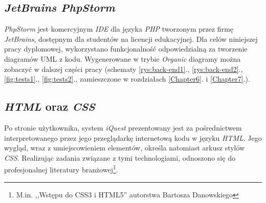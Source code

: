 \subsection{\textit{JetBrains PhpStorm}}
\label{Chapter63a}

\textit{PhpStorm} jest komercyjnym \textit{IDE} dla języka \textit{PHP} tworzonym przez firmę \textit{JetBrains}, dostępnym dla studentów na licencji edukacyjnej. Dla celów niniejszej pracy dyplomowej, wykorzystano funkcjonalność odpowiedzialną za tworzenie diagramów UML z kodu. Wygenerowane w trybie \textit{Organic} diagramy można zobaczyć w dalszej części pracy (schematy \ref{rys:back-end1}., \ref{rys:back-end2}., \ref{fig:tests1}., \ref{fig:tests2}., zamieszczone w rozdziałach \ref{Chapter6}. i \ref{Chapter7}.).

\subsection{\textit{HTML} oraz \textit{CSS}}
\label{Chapter63b}
Po stronie użytkownika, system \textit{iQuest} prezentowany jest za pośrednictwem interpretowanego przez jego przeglądarkę internetową kodu w języku \textit{HTML}. Jego wygląd, wraz z umiejscowieniem elementów, określa natomiast arkusz stylów \textit{CSS}. Realizując zadania związane z tymi technologiami, odnoszono się do profesjonalnej literatury branżowej\footnote{M.in. ,,Wstępu do CSS3 i HTML5'' autorstwa Bartosza Danowskiego\cite{BD:WdCiH11}}.